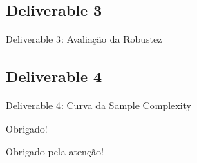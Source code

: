 \documentclass{beamer}
\begin{document}
\subsection{Deliverable 3}
\begin{frame}{Deliverable 3: Avaliação da Robustez}
\end{frame}

\subsection{Deliverable 4}
\begin{frame}{Deliverable 4: Curva da Sample Complexity}
\end{frame}

\begin{frame}{Obrigado!}
  \begin{center}
    Obrigado pela atenção!
  \end{center}
\end{frame}
\end{document}
